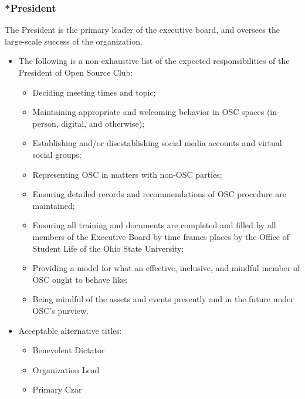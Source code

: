 \documentclass[12pt,letterpaper]{article}
\begin{document}
\subsubsection{*President}
The President is the primary leader of the executive board, and oversees the large-scale
success of the organization.
\begin{itemize}
  \item The following is a non-exhaustive list of the expected responsibilities of
    the President of Open Source Club:
    \begin{itemize}
      \item Deciding meeting times and topic;
      \item Maintaining appropriate and welcoming behavior in OSC spaces (in-person,
        digital, and otherwise);
      \item Establishing and/or disestablishing social media accounts and virtual
        social groups;
      \item Representing OSC in matters with non-OSC parties;
      \item Ensuring detailed records and recommendations of OSC procedure are
        maintained;
      \item Ensuring all training and documents are completed and filled by all
        members of the Executive Board by time frames places by the Office of Student
        Life of the Ohio State University;
      \item Providing a model for what an effective, inclusive, and mindful member of
        OSC ought to behave like;
      \item Being mindful of the assets and events presently and in the future under
        OSC's purview.
    \end{itemize}
  \item Acceptable alternative titles:
    \begin{itemize}
      \item Benevolent Dictator
      \item Organization Lead
      \item Primary Czar
    \end{itemize}
\end{itemize}
\end{document}
